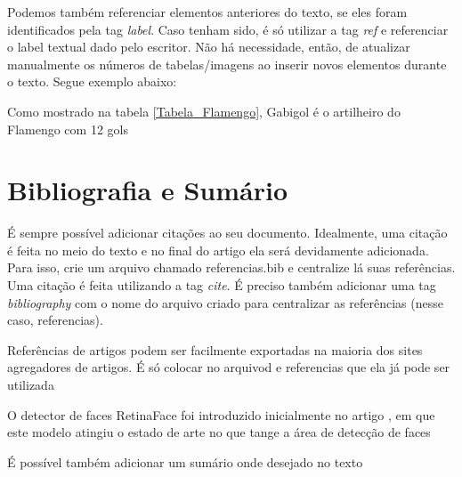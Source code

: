 \documentclass{article}
\begin{document}
Podemos também referenciar elementos anteriores do texto, se eles foram identificados pela tag \textit{label}. Caso tenham sido, é só utilizar a tag \textit{ref} e referenciar o label textual dado pelo escritor. Não há necessidade, então, de atualizar manualmente os números de tabelas/imagens ao inserir novos elementos durante o texto. Segue exemplo abaixo:

Como mostrado na tabela \ref{Tabela_Flamengo}, Gabigol é o artilheiro do Flamengo com 12 gols


\section{Bibliografia e Sumário}

É sempre possível adicionar citações ao seu documento. Idealmente, uma citação é feita no meio do texto e no final do artigo ela será devidamente adicionada. Para isso, crie um arquivo chamado referencias.bib e centralize lá suas referências. Uma citação é feita utilizando a tag \textit{cite}. É preciso também adicionar uma tag \textit{bibliography} com o nome do arquivo criado para centralizar as referências (nesse caso, referencias).

Referências de artigos podem ser facilmente exportadas na maioria dos sites agregadores de artigos. É só colocar no arquivod e referencias que ela já pode ser utilizada

O detector de faces RetinaFace foi introduzido inicialmente no artigo \cite{RetinaFacePaper:2019}, em que este modelo atingiu o estado de arte no que tange a área de detecção de faces

É possível também adicionar um sumário onde desejado no texto

\tableofcontents




\end{document}
